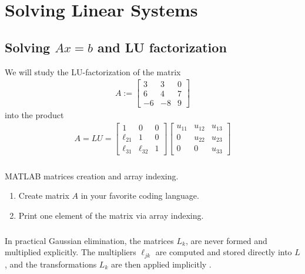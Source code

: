 \documentclass[11pt,letterpaper]{report}
\begin{document}
\chapter{Solving Linear Systems}
\section{Solving $Ax=b$ and LU factorization}
We will study the LU-factorization of the matrix
\begin{align*}
    A:=
  \begin{bmatrix}
    3  &   3   &    0\\
    6  &   4   &  7\\
    -6 &  -8   &   9
  \end{bmatrix}
\end{align*}
into the product
\begin{align*}
A = LU =
\begin{bmatrix}
1 & 0 & 0 \\
    \ell_{21} & 1 & 0\\
    \ell_{31} & \ell_{32} & 1
\end{bmatrix}
\begin{bmatrix}
    u_{11} & u_{12} & u_{13} \\
    0 & u_{22} & u_{23}\\
    0 & 0 & u_{33}
\end{bmatrix}
\end{align*}

\subsection{}
MATLAB matrices creation and array indexing.
\begin{enumerate}
    \item Create matrix $A$ in your favorite coding language.
    \item Print one element of the matrix via array indexing.
\end{enumerate}

\subsection{}
In practical Gaussian elimination, the matrices $L_k$, are never formed and multiplied explicitly. The multipliers $\ell_{jk}$ are computed and stored directly into $L$, and the transformations $L_k$ are then applied implicitly \cite[p.151]{TrefethenBau_97}.
\end{document}
